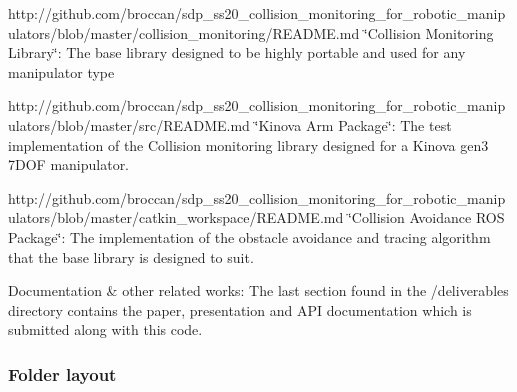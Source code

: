 \begin{DoxyItemize}
\item http\+://github.com/broccan/sdp\+\_\+ss20\+\_\+collision\+\_\+monitoring\+\_\+for\+\_\+robotic\+\_\+manipulators/blob/master/collision\+\_\+monitoring/\+R\+E\+A\+D\+M\+E.\+md \char`\"{}\+Collision Monitoring Library\char`\"{}\+: The base library designed to be highly portable and used for any manipulator type
\item http\+://github.com/broccan/sdp\+\_\+ss20\+\_\+collision\+\_\+monitoring\+\_\+for\+\_\+robotic\+\_\+manipulators/blob/master/src/\+R\+E\+A\+D\+M\+E.\+md \char`\"{}\+Kinova Arm Package\char`\"{}\+: The test implementation of the Collision monitoring library designed for a Kinova gen3 7\+D\+OF manipulator.
\item http\+://github.com/broccan/sdp\+\_\+ss20\+\_\+collision\+\_\+monitoring\+\_\+for\+\_\+robotic\+\_\+manipulators/blob/master/catkin\+\_\+workspace/\+R\+E\+A\+D\+M\+E.\+md \char`\"{}\+Collision Avoidance R\+O\+S Package\char`\"{}\+: The implementation of the obstacle avoidance and tracing algorithm that the base library is designed to suit.
\item Documentation \& other related works\+: The last section found in the /deliverables directory contains the paper, presentation and A\+PI documentation which is submitted along with this code.
\end{DoxyItemize}

\subsubsection*{Folder layout}

